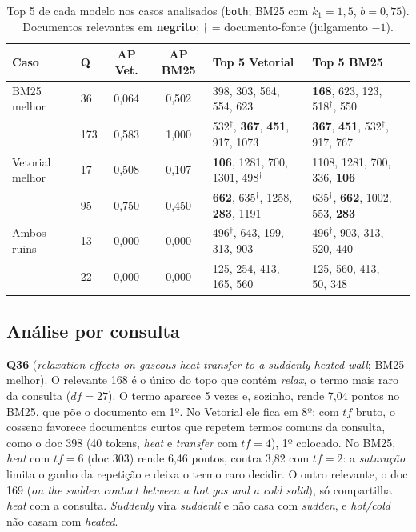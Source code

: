 \documentclass[10pt,a4paper]{article}
\newcommand{\term}[1]{\textit{#1}}      %
\newcommand{\rel}[1]{\textbf{#1}}       %
\newcommand{\fonte}[1]{#1$^\dagger$}    %
\begin{document}
\begin{table}[!htb]
  \centering\small
  \caption{Top 5 de cada modelo nos casos analisados (\texttt{both}; BM25 com $k_1=1{,}5$, $b=0{,}75$). Documentos relevantes em \textbf{negrito}; $\dagger$ = documento-fonte (julgamento $-1$).}
  \label{tab:casos}
  \begin{tabular}{llcclll}
    \toprule
    Caso & Q & AP Vet. & AP BM25 & Top 5 Vetorial & Top 5 BM25\\
    \midrule
    BM25 melhor     & 36  & 0,064 & 0,502 & 398, 303, 564, 554, 623 & \rel{168}, 623, 123, \fonte{518}, 550\\
                    & 173 & 0,583 & 1,000 & \fonte{532}, \rel{367}, \rel{451}, 917, 1073 & \rel{367}, \rel{451}, \fonte{532}, 917, 767\\
    Vetorial melhor & 17  & 0,508 & 0,107 & \rel{106}, 1281, 700, 1301, \fonte{498} & 1108, 1281, 700, 336, \rel{106}\\
                    & 95  & 0,750 & 0,450 & \rel{662}, \fonte{635}, 1258, \rel{283}, 1191 & \fonte{635}, \rel{662}, 1002, 553, \rel{283}\\
    Ambos ruins     & 13  & 0,000 & 0,000 & \fonte{496}, 643, 199, 313, 903 & \fonte{496}, 903, 313, 520, 440\\
                    & 22  & 0,000 & 0,000 & 125, 254, 413, 165, 560 & 125, 560, 413, 50, 348\\
    \bottomrule
  \end{tabular}
\end{table}

\subsection{Análise por consulta}\label{sec:casos}
\textbf{Q36} (\term{relaxation effects on gaseous heat transfer to a suddenly heated wall}; BM25 melhor). O relevante 168 é o único do topo que contém \term{relax}, o termo mais raro da consulta ($df=27$). O termo aparece 5 vezes e, sozinho, rende 7,04 pontos no BM25, que põe o documento em 1º. No Vetorial ele fica em 8º: com $tf$ bruto, o cosseno favorece documentos curtos que repetem termos comuns da consulta, como o doc 398 (40 tokens, \term{heat} e \term{transfer} com $tf=4$), 1º colocado. No BM25, \term{heat} com $tf=6$ (doc 303) rende 6,46 pontos, contra 3,82 com $tf=2$: a \emph{saturação} limita o ganho da repetição e deixa o termo raro decidir. O outro relevante, o doc 169 (\term{on the sudden contact between a hot gas and a cold solid}), só compartilha \term{heat} com a consulta. \term{Suddenly} vira \term{suddenli} e não casa com \term{sudden}, e \term{hot/cold} não casam com \term{heated}.
\end{document}
